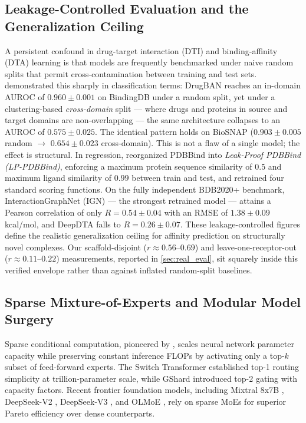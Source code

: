 \documentclass{article}
\theoremstyle{definition}
\begin{document}
\subsection{Leakage-Controlled Evaluation and the Generalization Ceiling}
A persistent confound in drug-target interaction (DTI) and binding-affinity (DTA) learning is that models are frequently benchmarked under naive random splits that permit cross-contamination between training and test sets. \citet{bai2023drugban} demonstrated this sharply in classification terms: DrugBAN reaches an in-domain AUROC of $0.960 \pm 0.001$ on BindingDB under a random split, yet under a clustering-based \emph{cross-domain} split --- where drugs and proteins in source and target domains are non-overlapping --- the same architecture collapses to an AUROC of $0.575 \pm 0.025$. The identical pattern holds on BioSNAP ($0.903 \pm 0.005$ random $\rightarrow$ $0.654 \pm 0.023$ cross-domain). This is not a flaw of a single model; the effect is structural. In regression, \citet{li2023leakproof} reorganized PDBBind into \emph{Leak-Proof PDBBind (LP-PDBBind)}, enforcing a maximum protein sequence similarity of $0.5$ and maximum ligand similarity of $0.99$ between train and test, and retrained four standard scoring functions. On the fully independent BDB2020+ benchmark, InteractionGraphNet (IGN) --- the strongest retrained model --- attains a Pearson correlation of only $R = 0.54 \pm 0.04$ with an RMSE of $1.38 \pm 0.09$ kcal/mol, and DeepDTA falls to $R = 0.26 \pm 0.07$. These leakage-controlled figures define the realistic generalization ceiling for affinity prediction on structurally novel complexes. Our scaffold-disjoint ($r \approx 0.56$--$0.69$) and leave-one-receptor-out ($r \approx 0.11$--$0.22$) measurements, reported in \cref{sec:real_eval}, sit squarely inside this verified envelope rather than against inflated random-split baselines.

\subsection{Sparse Mixture-of-Experts and Modular Model Surgery}
Sparse conditional computation, pioneered by \citet{shazeer2017outrageously}, scales neural network parameter capacity while preserving constant inference FLOPs by activating only a top-$k$ subset of feed-forward experts. The Switch Transformer \citep{fedus2022switch} established top-1 routing simplicity at trillion-parameter scale, while GShard \citep{lepikhin2021gshard} introduced top-2 gating with capacity factors. Recent frontier foundation models, including Mixtral 8x7B \citep{jiang2024mixtral}, DeepSeek-V2 \citep{deepseek2024deepseekv2}, DeepSeek-V3 \citep{deepseek2024deepseekv3}, and OLMoE \citep{muennighoff2024olmoe}, rely on sparse MoEs for superior Pareto efficiency over dense counterparts.
\end{document}

